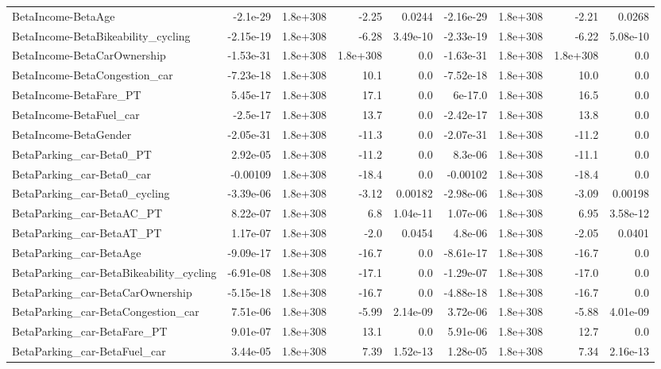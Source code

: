 \begin{tabular}{lrrrrrrrr}
BetaIncome-BetaAge & -2.1e-29 & 1.8e+308 & -2.25 & 0.0244 & -2.16e-29 & 1.8e+308 & -2.21 & 0.0268 \\
BetaIncome-BetaBikeability_cycling & -2.15e-19 & 1.8e+308 & -6.28 & 3.49e-10 & -2.33e-19 & 1.8e+308 & -6.22 & 5.08e-10 \\
BetaIncome-BetaCarOwnership & -1.53e-31 & 1.8e+308 & 1.8e+308 & 0.0 & -1.63e-31 & 1.8e+308 & 1.8e+308 & 0.0 \\
BetaIncome-BetaCongestion_car & -7.23e-18 & 1.8e+308 & 10.1 & 0.0 & -7.52e-18 & 1.8e+308 & 10.0 & 0.0 \\
BetaIncome-BetaFare_PT & 5.45e-17 & 1.8e+308 & 17.1 & 0.0 & 6e-17.0 & 1.8e+308 & 16.5 & 0.0 \\
BetaIncome-BetaFuel_car & -2.5e-17 & 1.8e+308 & 13.7 & 0.0 & -2.42e-17 & 1.8e+308 & 13.8 & 0.0 \\
BetaIncome-BetaGender & -2.05e-31 & 1.8e+308 & -11.3 & 0.0 & -2.07e-31 & 1.8e+308 & -11.2 & 0.0 \\
BetaParking_car-Beta0_PT & 2.92e-05 & 1.8e+308 & -11.2 & 0.0 & 8.3e-06 & 1.8e+308 & -11.1 & 0.0 \\
BetaParking_car-Beta0_car & -0.00109 & 1.8e+308 & -18.4 & 0.0 & -0.00102 & 1.8e+308 & -18.4 & 0.0 \\
BetaParking_car-Beta0_cycling & -3.39e-06 & 1.8e+308 & -3.12 & 0.00182 & -2.98e-06 & 1.8e+308 & -3.09 & 0.00198 \\
BetaParking_car-BetaAC_PT & 8.22e-07 & 1.8e+308 & 6.8 & 1.04e-11 & 1.07e-06 & 1.8e+308 & 6.95 & 3.58e-12 \\
BetaParking_car-BetaAT_PT & 1.17e-07 & 1.8e+308 & -2.0 & 0.0454 & 4.8e-06 & 1.8e+308 & -2.05 & 0.0401 \\
BetaParking_car-BetaAge & -9.09e-17 & 1.8e+308 & -16.7 & 0.0 & -8.61e-17 & 1.8e+308 & -16.7 & 0.0 \\
BetaParking_car-BetaBikeability_cycling & -6.91e-08 & 1.8e+308 & -17.1 & 0.0 & -1.29e-07 & 1.8e+308 & -17.0 & 0.0 \\
BetaParking_car-BetaCarOwnership & -5.15e-18 & 1.8e+308 & -16.7 & 0.0 & -4.88e-18 & 1.8e+308 & -16.7 & 0.0 \\
BetaParking_car-BetaCongestion_car & 7.51e-06 & 1.8e+308 & -5.99 & 2.14e-09 & 3.72e-06 & 1.8e+308 & -5.88 & 4.01e-09 \\
BetaParking_car-BetaFare_PT & 9.01e-07 & 1.8e+308 & 13.1 & 0.0 & 5.91e-06 & 1.8e+308 & 12.7 & 0.0 \\
BetaParking_car-BetaFuel_car & 3.44e-05 & 1.8e+308 & 7.39 & 1.52e-13 & 1.28e-05 & 1.8e+308 & 7.34 & 2.16e-13 \\

\end{tabular}
